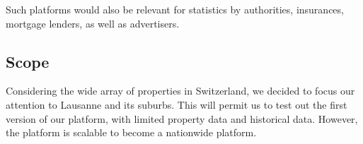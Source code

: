 \documentclass[main]{subfiles}
\begin{document}
Such platforms would also be relevant for statistics by authorities, insurances, mortgage lenders, 
as well as advertisers.

\subsection{Scope}
Considering the wide array of properties in Switzerland, 
we decided to focus our attention to Lausanne and its suburbs. 
This will permit us to test out the first version of our platform, 
with limited property data and historical data. 
However, the platform is scalable to become a nationwide platform. 
\end{document}
